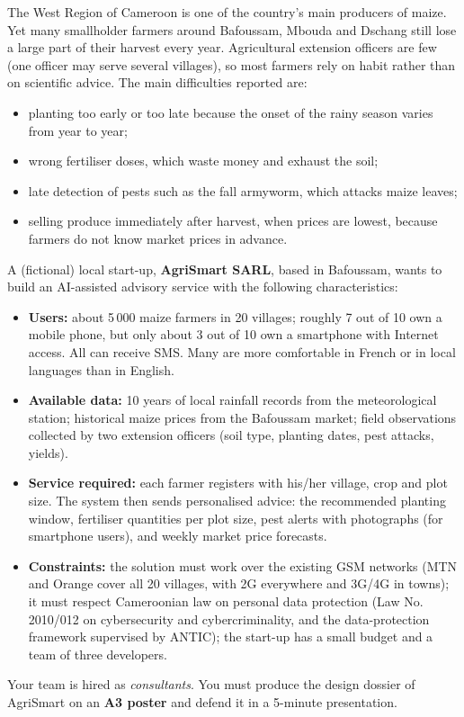 \documentclass[11pt]{article}
\newcounter{popsec}
\newcounter{popsub}
\newcommand{\courssub}[1]{%
  \stepcounter{popsub}%
  \par\vspace{9pt}\noindent{\popxbold\fontsize{11.5}{13}\selectfont\color{popink}{\color{poporange}\thepopsec.\thepopsub}\hspace{6pt}#1}\par\nopagebreak\vspace{4pt}
}
\begin{document}
\courssub{Situation}

\begin{experience}
The West Region of Cameroon is one of the country's main producers of maize. Yet many smallholder farmers around Bafoussam, Mbouda and Dschang still lose a large part of their harvest every year. Agricultural extension officers are few (one officer may serve several villages), so most farmers rely on habit rather than on scientific advice. The main difficulties reported are:

\begin{itemize}
\item planting too early or too late because the onset of the rainy season varies from year to year;
\item wrong fertiliser doses, which waste money and exhaust the soil;
\item late detection of pests such as the fall armyworm, which attacks maize leaves;
\item selling produce immediately after harvest, when prices are lowest, because farmers do not know market prices in advance.
\end{itemize}

A (fictional) local start-up, \textbf{AgriSmart SARL}, based in Bafoussam, wants to build an AI-assisted advisory service with the following characteristics:

\begin{itemize}
\item \textbf{Users:} about 5\,000 maize farmers in 20 villages; roughly 7 out of 10 own a mobile phone, but only about 3 out of 10 own a smartphone with Internet access. All can receive SMS. Many are more comfortable in French or in local languages than in English.
\item \textbf{Available data:} 10 years of local rainfall records from the meteorological station; historical maize prices from the Bafoussam market; field observations collected by two extension officers (soil type, planting dates, pest attacks, yields).
\item \textbf{Service required:} each farmer registers with his/her village, crop and plot size. The system then sends personalised advice: the recommended planting window, fertiliser quantities per plot size, pest alerts with photographs (for smartphone users), and weekly market price forecasts.
\item \textbf{Constraints:} the solution must work over the existing GSM networks (MTN and Orange cover all 20 villages, with 2G everywhere and 3G/4G in towns); it must respect Cameroonian law on personal data protection (Law No. 2010/012 on cybersecurity and cybercriminality, and the data-protection framework supervised by ANTIC); the start-up has a small budget and a team of three developers.
\end{itemize}

Your team is hired as \emph{consultants}. You must produce the design dossier of AgriSmart on an \textbf{A3 poster} and defend it in a 5-minute presentation.
\end{experience}
\end{document}

